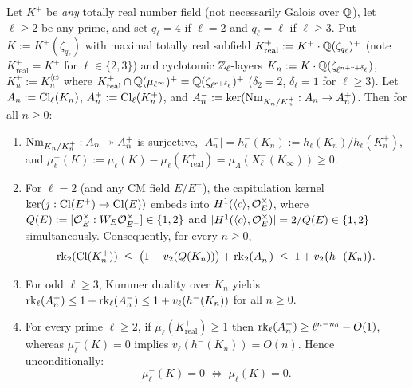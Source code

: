 \begin{theorem}[Elementary $\rk_2$-Reflection and $\mu_\ell^- = 0 \iff \mu_\ell = 0$]\label{thm:3:kronecker}
\tagProved{}
Let $K^+$ be \emph{any} totally real number field (not necessarily Galois over $\mathbb{Q}$), let $\ell \ge 2$ be any prime, and set $q_\ell = 4$ if $\ell = 2$ and $q_\ell = \ell$ if $\ell \ge 3$. Put $K := K^+(\zeta_{q_\ell})$ with maximal totally real subfield $K_{\mathrm{real}}^+ := K^+ \cdot \mathbb{Q}(\zeta_{q_\ell})^+$ (note $K_{\mathrm{real}}^+ = K^+$ for $\ell \in \{2,3\}$) and cyclotomic $\mathbb{Z}_\ell$-layers $K_n := K \cdot \mathbb{Q}(\zeta_{\ell^{n+r+\delta_\ell}})$, $K_n^+ := K_n^{\langle c \rangle}$ where $K_{\mathrm{real}}^+ \cap \mathbb{Q}(\mu_{\ell^\infty})^+ = \mathbb{Q}(\zeta_{\ell^{r+\delta_\ell}})^+$ ($\delta_2 = 2$, $\delta_\ell = 1$ for $\ell \ge 3$). Let $A_n := \mathrm{Cl}_\ell(K_n)$, $A_n^+ := \mathrm{Cl}_\ell(K_n^+)$, and $A_n^- := \ker(\operatorname{Nm}_{K_n/K_n^+} : A_n \to A_n^+)$. Then for all $n \ge 0$:
\begin{enumerate}[label=\textup{(\roman*)}]
\item $\operatorname{Nm}_{K_n/K_n^+} : A_n \twoheadrightarrow A_n^+$ is surjective, $|A_n^-| = h_\ell^-(K_n) := h_\ell(K_n)/h_\ell(K_n^+)$, and $\mu_\ell^-(K) := \mu_\ell(K) - \mu_\ell(K_{\mathrm{real}}^+) = \mu_\Lambda(X_\ell^-(K_\infty)) \ge 0$.
\item For $\ell = 2$ (and any CM field $E/E^+$), the capitulation kernel $\ker(j : \mathrm{Cl}(E^+) \to \mathrm{Cl}(E))$ embeds into $H^1(\langle c \rangle, \mathcal{O}_E^\times)$, where $Q(E) := [\mathcal{O}_E^\times : W_E \mathcal{O}_{E^+}^\times] \in \{1, 2\}$ and $|H^1(\langle c \rangle, \mathcal{O}_E^\times)| = 2/Q(E) \in \{1, 2\}$ simultaneously. Consequently, for every $n \ge 0$,
\begin{equation}\label{eq:3:rk2}
  \operatorname{rk}_2(\mathrm{Cl}(K_n^+)) \;\le\; \bigl(1 - v_2(Q(K_n))\bigr) + \operatorname{rk}_2(A_n^-) \;\le\; 1 + v_2\bigl(h^-(K_n)\bigr).
\end{equation}
\item For odd $\ell \ge 3$, Kummer duality over $K_n$ yields $\operatorname{rk}_\ell(A_n^+) \le 1 + \operatorname{rk}_\ell(A_n^-) \le 1 + v_\ell(h^-(K_n))$ for all $n \ge 0$.
\item For every prime $\ell \ge 2$, if $\mu_\ell(K_{\mathrm{real}}^+) \ge 1$ then $\operatorname{rk}_\ell(A_n^+) \ge \ell^{n - n_0} - O(1)$, whereas $\mu_\ell^-(K) = 0$ implies $v_\ell(h^-(K_n)) = O(n)$. Hence unconditionally:
\[
  \mu_\ell^-(K) = 0 \;\Longleftrightarrow\; \mu_\ell(K) = 0.
\]
\end{enumerate}
\end{theorem}
